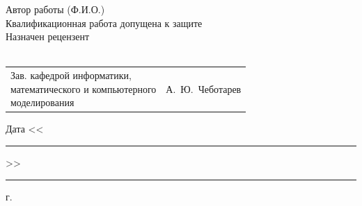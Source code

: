 \documentclass{imcs}
\begin{document}
\pagebreak

\noindent Автор работы  (Ф.И.О.)\\

\noindent{}Квалификационная работа допущена к защите\\

\noindent{}Назначен рецензент\\
\\

\vspace{2\baselineskip}
\noindent\begin{tabular}{p{} p{}}
\parbox{8cm}{Зав. кафедрой информатики,\\ математического и компьютерного\\ моделирования} &
\hfill А.~Ю.~Чеботарев\\
\end{tabular}
\vspace{2\baselineskip}
\begin{flushright}
Дата <<\rule{1cm}{0.5pt}>>\rule{3cm}{0.5pt} г.
\end{flushright}
\end{document}
